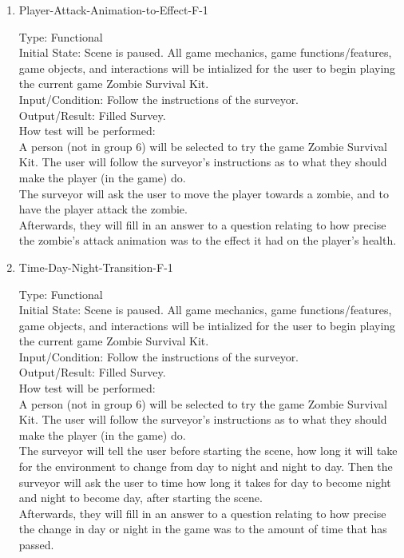 \documentclass[12pt, titlepage]{article}
\begin{document}
\begin{enumerate}
	
	\item{Player-Attack-Animation-to-Effect-F-1\\}
	
	Type: Functional\\
	
	Initial State: Scene is paused. All game mechanics, game functions/features, game objects, and interactions will be intialized for the user to begin playing the current game Zombie Survival Kit.\\
	
	Input/Condition: Follow the instructions of the surveyor.\\
	
	Output/Result: Filled Survey.\\
	
	How test will be performed:\\ A person (not in group 6) will be selected to try the game Zombie Survival Kit. The user will follow the surveyor's instructions as to what they should make the player (in the game) do. \\
	The surveyor will ask the user to move the player towards a zombie, and to have the player attack the zombie.\\
	Afterwards, they will fill in an answer to a question relating to how precise the zombie's attack animation was to the effect it had on the player's health.\\		
	
	\item{Time-Day-Night-Transition-F-1\\}
	
	Type: Functional\\
	
	Initial State: Scene is paused. All game mechanics, game functions/features, game objects, and interactions will be intialized for the user to begin playing the current game Zombie Survival Kit.\\
	
	Input/Condition: Follow the instructions of the surveyor.\\
	
	Output/Result: Filled Survey.\\
	
	How test will be performed:\\ A person (not in group 6) will be selected to try the game Zombie Survival Kit. The user will follow the surveyor's instructions as to what they should make the player (in the game) do. \\
	The surveyor will tell the user before starting the scene, how long it will take for the environment to change from day to night and night to day. Then the surveyor will ask the user to time how long it takes for day to become night and night to become day, after starting the scene. \\
	Afterwards, they will fill in an answer to a question relating to how precise the change in day or night in the game was to the amount of time that has passed.\\
	

\end{enumerate}
\end{document}
